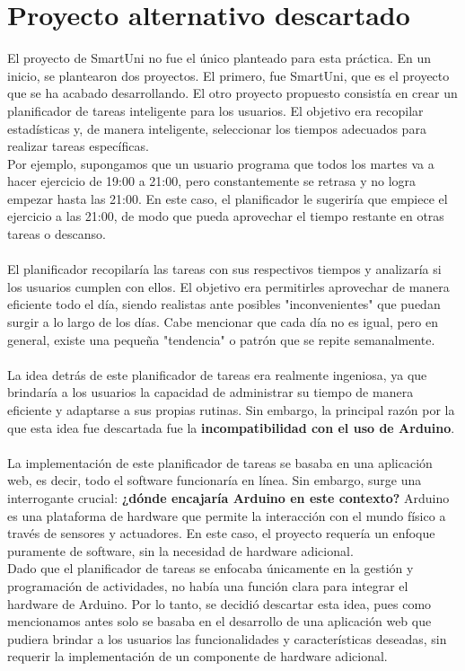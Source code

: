 \documentclass[12pt]{report}
\begin{document}
\section{Proyecto alternativo descartado}
El proyecto de SmartUni no fue el único planteado para esta práctica. En un inicio, se plantearon dos proyectos. El primero, fue SmartUni, que es el proyecto que se ha acabado desarrollando. El otro proyecto propuesto consistía en crear un planificador de tareas inteligente para los usuarios. El objetivo era recopilar estadísticas y, de manera inteligente, seleccionar los tiempos adecuados para realizar tareas específicas. 
\\Por ejemplo, supongamos que un usuario programa que todos los martes va a hacer ejercicio de 19:00 a 21:00, pero constantemente se retrasa y no logra empezar hasta las 21:00. En este caso, el planificador le sugeriría que empiece el ejercicio a las 21:00, de modo que pueda aprovechar el tiempo restante en otras tareas o descanso.
\\\\
El planificador recopilaría las tareas con sus respectivos tiempos y analizaría si los usuarios cumplen con ellos. El objetivo era permitirles aprovechar de manera eficiente todo el día, siendo realistas ante posibles "inconvenientes" que puedan surgir a lo largo de los días. Cabe mencionar que cada día no es igual, pero en general, existe una pequeña "tendencia" o patrón que se repite semanalmente.
\\\\
La idea detrás de este planificador de tareas era realmente ingeniosa, ya que brindaría a los usuarios la capacidad de administrar su tiempo de manera eficiente y adaptarse a sus propias rutinas. Sin embargo, la principal razón por la que esta idea fue descartada fue la \textbf{incompatibilidad con el uso de Arduino}.
\\\\
La implementación de este planificador de tareas se basaba en una aplicación web, es decir, todo el software funcionaría en línea. Sin embargo, surge una interrogante crucial: \textbf{¿dónde encajaría Arduino en este contexto?} Arduino es una plataforma de hardware que permite la interacción con el mundo físico a través de sensores y actuadores. En este caso, el proyecto requería un enfoque puramente de software, sin la necesidad de hardware adicional.
\\
Dado que el planificador de tareas se enfocaba únicamente en la gestión y programación de actividades, no había una función clara para integrar el hardware de Arduino. Por lo tanto, se decidió descartar esta idea, pues como mencionamos antes solo se basaba en el desarrollo de una aplicación web que pudiera brindar a los usuarios las funcionalidades y características deseadas, sin requerir la implementación de un componente de hardware adicional.
\newpage
\end{document}
